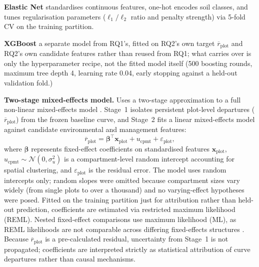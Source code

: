 \begin{enumerate*}[label=(\roman*)]
\item \textbf{Elastic Net} standardises continuous features, one-hot encodes soil classes, and tunes regularisation parameters ($\ell_1/\ell_2$ ratio and penalty strength) via 5-fold CV on the training partition.
\item \textbf{XGBoost} a separate model from RQ1's, fitted on RQ2's own target
  $\overline{r}_{\text{plot}}$ and RQ2's own candidate features rather than reused from RQ1;
  what carries over is only the hyperparameter recipe, not the fitted model itself (500 boosting
  rounds, maximum tree depth 4, learning rate 0.04, early stopping against a held-out validation fold.) %
\item \textbf{Two-stage mixed-effects model.} Uses a two-stage approximation to a full non-linear mixed-effects model \citep{socha2016Assessment_C2_CR}. Stage~1 isolates persistent plot-level departures ($\overline{r}_{\text{plot}}$) from the frozen baseline curve, and Stage~2 fits a linear mixed-effects model against candidate environmental and management features:
\begin{equation}
\overline{r}_{\text{plot}} = \boldsymbol{\beta}^{\top}\mathbf{x}_{\text{plot}} + u_{\text{cpmt}} + \varepsilon_{\text{plot}},
\label{eq:mixed-effects}
\end{equation}
where $\boldsymbol{\beta}$ represents fixed-effect coefficients on standardised features $\mathbf{x}_{\text{plot}}$, $u_{\text{cpmt}} \sim \mathcal{N}(0, \sigma_u^2)$ is a compartment-level random intercept accounting for spatial clustering, and $\varepsilon_{\text{plot}}$ is the residual error. The model uses random intercepts only; random slopes were omitted because compartment sizes vary widely (from single plots to over a thousand) and no varying-effect hypotheses were posed. Fitted on the training partition just for attribution rather than held-out prediction, coefficients are estimated via restricted maximum likelihood (REML). Nested fixed-effect comparisons use maximum likelihood (ML), as REML likelihoods are not comparable across differing fixed-effects structures \citep{pinheiro2000Mixed_C5_EVAL}. Because $\overline{r}_{\text{plot}}$ is a pre-calculated residual, uncertainty from Stage~1 is not propagated; coefficients are interpreted strictly as statistical attribution of curve departures rather than causal mechanisms.
\end{enumerate*}
